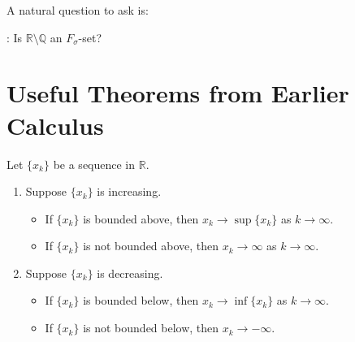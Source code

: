 \documentclass[notoc,notitlepage]{tufte-book}
\begin{document}
A natural question to ask is:

: Is $\mathbb{R} \setminus \mathbb{Q}$ an $F_\sigma$-set?


\appendix

\chapter{Useful Theorems from Earlier Calculus}%
\label{chp:useful_theorems_from_earlier_calculus}

\begin{thm}\label{thm:monotone_convergence_theorem}
  Let $\{x_k\}$ be a sequence in $\mathbb{R}$.
  \begin{enumerate}
    \item Suppose $\{x_k\}$ is increasing.
      \begin{itemize}
        \item If $\{ x_k \}$ is bounded above, then $x_k \to \sup \{ x_k \}$ as $k \to \infty$.
        \item If $\{ x_k \}$ is not bounded above, then $x_k \to \infty$ as $k \to \infty$.
      \end{itemize}
    \item Suppose $\{ x_k \}$ is decreasing.
      \begin{itemize}
        \item If $\{ x_k \}$ is bounded below, then $x_k \to \inf \{ x_k \}$ as $k \to \infty$.
        \item If $\{ x_k \}$ is not bounded below, then $x_k \to -\infty$.
      \end{itemize}
  \end{enumerate}
\end{thm}


\backmatter\

\pagestyle{plain}



\printindex
\end{document}
